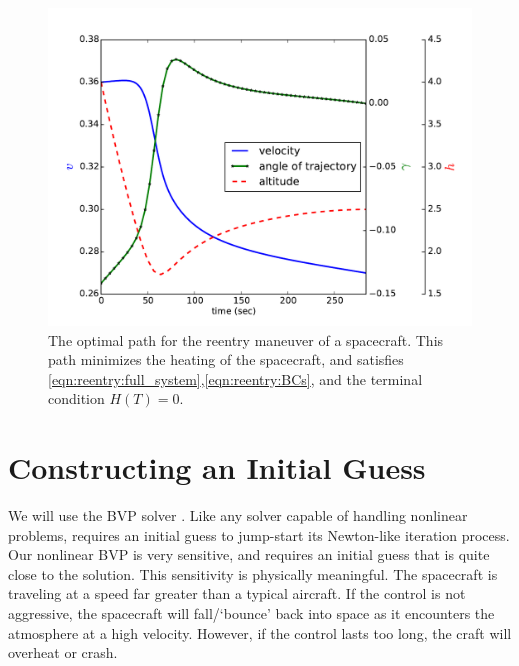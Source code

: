 \begin{figure}
\centering
\includegraphics[width=\textwidth]{solutions.pdf}
\caption{The optimal path for the reentry maneuver of a spacecraft. 
This path minimizes the heating of the spacecraft, and satisfies  \eqref{eqn:reentry:full_system},\eqref{eqn:reentry:BCs}, and the terminal condition $H(T) = 0$.
}
\label{fig:reentry:solutions}
\end{figure}


\section*{Constructing an Initial Guess}
We will use the BVP solver . 
Like any solver capable of handling nonlinear problems,  requires an initial guess to jump-start its Newton-like iteration process. 
Our nonlinear BVP is very sensitive, and requires an initial guess that is quite close to the solution.  
This sensitivity is physically meaningful. 
The spacecraft is traveling at a speed far greater than a typical aircraft. 
If the control is not aggressive, the spacecraft will fall/`bounce' back into space as it encounters the atmosphere at a high velocity. 
However, if the control lasts too long, the craft will overheat or crash.

